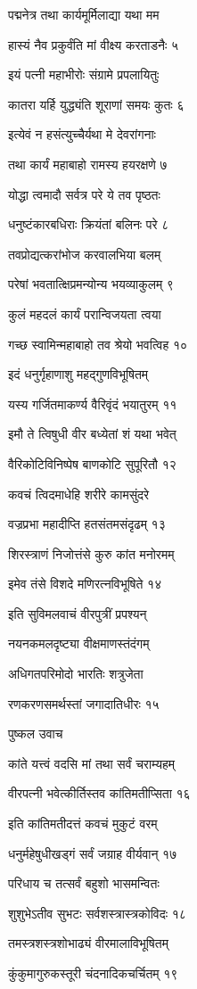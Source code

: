 पद्मनेत्र तथा कार्यमूर्मिलाद्या यथा मम

हास्यं नैव प्रकुर्वंति मां वीक्ष्य करताडनैः ५

इयं पत्नी महाभीरोः संग्रामे प्रपलायितुः

कातरा यर्हि युद्ध्यंति शूराणां समयः कुतः ६

इत्येवं न हसंत्युच्चैर्यथा मे देवरांगनाः

तथा कार्यं महाबाहो रामस्य हयरक्षणे ७

योद्धा त्वमादौ सर्वत्र परे ये तव पृष्ठतः

धनुष्टंकारबधिराः क्रियंतां बलिनः परे ८

तवप्रोद्यत्करांभोज करवालभिया बलम्

परेषां भवतात्क्षिप्रमन्योन्य भयव्याकुलम् ९

कुलं महदलं कार्यं परान्विजयता त्वया

गच्छ स्वामिन्महाबाहो तव श्रेयो भवत्विह १०

इदं धनुर्गृहाणाशु महद्गुणविभूषितम्

यस्य गर्जितमाकर्ण्य वैरिवृंदं भयातुरम् ११

इमौ ते त्विषुधी वीर बध्येतां शं यथा भवेत्

वैरिकोटिविनिष्पेष बाणकोटि सुपूरितौ १२

कवचं त्विदमाधेहि शरीरे कामसुंदरे

वज्रप्रभा महादीप्ति हतसंतमसंदृढम् १३

शिरस्त्राणं निजोत्तंसे कुरु कांत मनोरमम्

इमेव तंसे विशदे मणिरत्नविभूषिते १४

इति सुविमलवाचं वीरपुत्रीं प्रपश्यन्

नयनकमलदृष्ट्या वीक्षमाणस्तंदंगम्

अधिगतपरिमोदो भारतिः शत्रुजेता

रणकरणसमर्थस्तां जगादातिधीरः १५

पुष्कल उवाच

कांते यत्त्वं वदसि मां तथा सर्वं चराम्यहम्

वीरपत्नी भवेत्कीर्तिस्तव कांतिमतीप्सिता १६

इति कांतिमतीदत्तं कवचं मुकुटं वरम्

धनुर्महेषुधीखड्गं सर्वं जग्राह वीर्यवान् १७

परिधाय च तत्सर्वं बहुशो भासमन्वितः

शुशुभेऽतीव सुभटः सर्वशस्त्रास्त्रकोविदः १८

तमस्त्रशस्त्रशोभाढ्यं वीरमालाविभूषितम्

कुंकुमागुरुकस्तूरी चंदनादिकचर्चितम् १९

